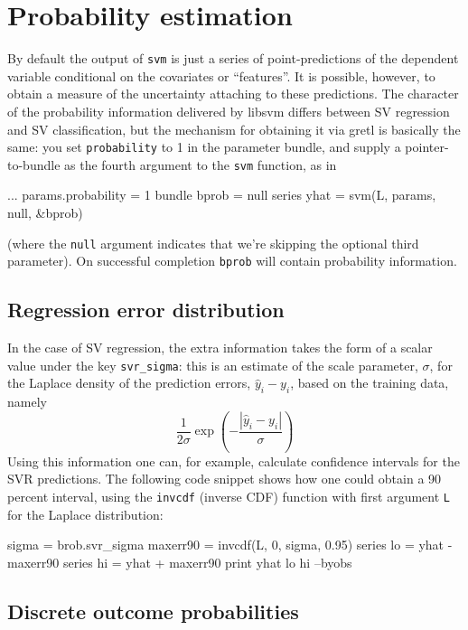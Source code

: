 \documentclass{article}
\begin{document}
\section{Probability estimation}
\label{sec:SV-probs}

By default the output of \texttt{svm} is just a series of
point-predictions of the dependent variable conditional on the
covariates or ``features''. It is possible, however, to obtain a
measure of the uncertainty attaching to these predictions.  The
character of the probability information delivered by \textsf{libsvm}
differs between SV regression and SV classification, but the mechanism
for obtaining it via gretl is basically the same: you set
\texttt{probability} to 1 in the parameter bundle, and supply a
pointer-to-bundle as the fourth argument to the \texttt{svm} function,
as in
\begin{code}
...
params.probability = 1
bundle bprob = null
series yhat = svm(L, params, null, &bprob)
\end{code}
(where the \texttt{null} argument indicates that we're skipping the
optional third parameter). On successful completion \texttt{bprob}
will contain probability information.

\subsection{Regression error distribution}
\label{sec:SVR-probs}

In the case of SV regression, the extra information takes the
form of a scalar value under the key \texttt{svr\_sigma}: this is an
estimate of the scale parameter, $\sigma$, for the Laplace density of
the prediction errors, $\hat{y}_i - y_i$, based on the training data,
namely
\[
\frac{1}{2\sigma} \exp \left(-\frac{|\hat{y}_i - y_i|}{\sigma}\right)
\]
Using this information one can, for example, calculate confidence
intervals for the SVR predictions. The following code snippet shows
how one could obtain a 90 percent interval, using the \texttt{invcdf}
(inverse CDF) function with first argument \texttt{L} for the Laplace
distribution:
\begin{code}
sigma = brob.svr_sigma
maxerr90 = invcdf(L, 0, sigma, 0.95)
series lo = yhat - maxerr90
series hi = yhat + maxerr90
print yhat lo hi --byobs
\end{code}

\subsection{Discrete outcome probabilities}
\label{sec:SVC-probs}
\end{document}
